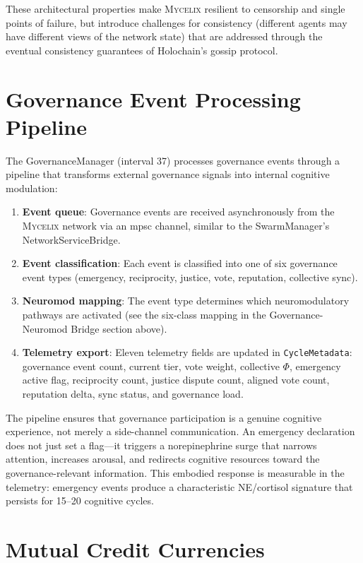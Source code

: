 \documentclass[12pt]{book}
\newcommand{\mycelix}{\textsc{Mycelix}}
\begin{document}
These architectural properties make \mycelix{} resilient to censorship and single points of failure, but introduce challenges for consistency (different agents may have different views of the network state) that are addressed through the eventual consistency guarantees of Holochain's gossip protocol.

\section{Governance Event Processing Pipeline}

The GovernanceManager (interval 37) processes governance events through a pipeline that transforms external governance signals into internal cognitive modulation:

\begin{enumerate}
  \item \textbf{Event queue}: Governance events are received asynchronously from the \mycelix{} network via an mpsc channel, similar to the SwarmManager's NetworkServiceBridge.
  \item \textbf{Event classification}: Each event is classified into one of six governance event types (emergency, reciprocity, justice, vote, reputation, collective sync).
  \item \textbf{Neuromod mapping}: The event type determines which neuromodulatory pathways are activated (see the six-class mapping in the Governance-Neuromod Bridge section above).
  \item \textbf{Telemetry export}: Eleven telemetry fields are updated in \texttt{CycleMetadata}: governance event count, current tier, vote weight, collective $\Phi$, emergency active flag, reciprocity count, justice dispute count, aligned vote count, reputation delta, sync status, and governance load.
\end{enumerate}

The pipeline ensures that governance participation is a genuine cognitive experience, not merely a side-channel communication. An emergency declaration does not just set a flag---it triggers a norepinephrine surge that narrows attention, increases arousal, and redirects cognitive resources toward the governance-relevant information. This embodied response is measurable in the telemetry: emergency events produce a characteristic NE/cortisol signature that persists for 15--20 cognitive cycles.

\section{Mutual Credit Currencies}
\end{document}
